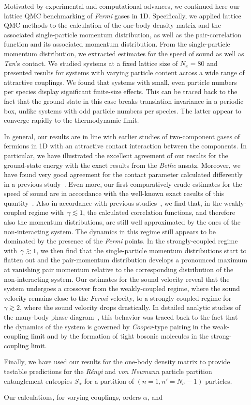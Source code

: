 \documentclass[pra,aps,groupedaddress,floatfix,twocolumn,superscriptaddress,showpacs,nofootinbib]{revtex4-1}
\begin{document}
{Motivated by experimental and computational advances, we continued here
our lattice QMC benchmarking of {\it Fermi} gases in 1D. Specifically, we
applied lattice QMC methods to the calculation of the one-body density matrix and the associated
single-particle momentum distribution, as well as the pair-correlation function and its associated
momentum distribution. From the single-particle momentum distribution, we extracted
estimates for the speed of sound as well as {\it Tan}'s contact.
We studied systems at a fixed lattice size of $N_x=80$ and presented results
for systems with varying particle content across a wide range of attractive couplings.
We found that systems with small, even particle numbers per species display significant finite-size
effects. This can be traced back to the fact that the ground state in this case
breaks translation invariance in a periodic box, unlike systems with odd particle
numbers per species. The latter appear to converge rapidly to the thermodynamic limit.

In general, our results are in line with earlier studies of two-component gases of fermions in 1D
with an attractive contact interaction between the components. In particular, we have illustrated the
excellent agreement of our results for the ground-state energy with the exact results from the
{\it Bethe} ansatz. Moreover, we have found very good agreement for the contact parameter calculated
differently in a previous study~\cite{GCS1D}. Even more, our first comparatively crude estimates for the
speed of sound are in accordance with the well-known exact results of this
quantity~\cite{Krivnov,PhysRev.130.1605,2004PhRvL..93i0408F}.
Also in accordance with previous studies~\cite{2004PhRvL..93i0408F,wadati},
we find that, in the weakly-coupled regime with~$\gamma \lesssim 1$, the calculated
correlation functions, and therefore also the momentum distributions, are still
well approximated by the ones of the non-interacting system. The dynamics in this regime still appears to
be dominated by the presence of the {\it Fermi} points. In the strongly-coupled regime with~$\gamma\gtrsim 1$,
we then find that the single-particle momentum distributions start to flatten out and the
pair-momentum distribution develops a pronounced maximum at vanishing pair momentum
{relative to the corresponding distribution of the non-interacting system.}
Our estimates for the sound velocity reveal that the system undergoes a crossover from the
weakly-coupled regime, where the sound velocity remains close to the {\it Fermi} velocity,
to a strongly-coupled regime for~$\gamma\gtrsim 2$, where the sound velocity drops drastically.
In detailed analytic studies of the many-body
phase diagram~\cite{PhysRev.130.1605,Krivnov,2004PhRvL..93i0408F,wadati}, this behavior was
traced back to the fact that the dynamics
of the system is governed by {\it Cooper}-type pairing in the weak-coupling limit
and by the formation of tight bosonic molecules in the strong-coupling limit.

Finally, we have used our results for the one-body density matrix to provide testable
predictions for {the {\it R{\'e}nyi}}
{and {\it von Neumann} particle} partition entanglement entropies $S_{\alpha}$
for a partition of $(n=1,n'=N_{\sigma}-1)$ particles.} Our calculations, for varying couplings, orders $\alpha$, and
\end{document}
